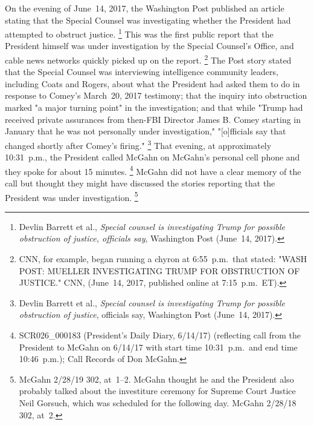 On the evening of June~14, 2017, the Washington Post published an article stating that the Special Counsel was investigating whether the President had attempted to obstruct justice.%
\footnote{Devlin Barrett et al., \textit{Special counsel is investigating Trump for possible obstruction of justice, officials say}, Washington Post (June~14, 2017).}
This was the first public report that the President himself was under investigation by the Special Counsel's Office, and cable news networks quickly picked up on the report.%
\footnote{CNN, for example, began running a chyron at 6:55~p.m.\ that stated: "WASH POST: MUELLER INVESTIGATING TRUMP FOR OBSTRUCTION OF JUSTICE." CNN, (June~14, 2017, published online at 7:15~p.m.~ET).}
The Post story stated that the Special Counsel was interviewing intelligence community leaders, including Coats and Rogers, about what the President had asked them to do in response to Comey's March~20, 2017 testimony;
that the inquiry into obstruction marked "a major turning point" in the investigation;
and that while "Trump had received private assurances from then-FBI Director James B. Comey starting in January that he was not personally under investigation," "[o]fficials say that changed shortly after Comey's firing."%
\footnote{Devlin Barrett et al., \textit{Special counsel is investigating Trump for possible obstruction of justice}, officials say, Washington Post (June~14, 2017).}
That evening, at approximately 10:31~p.m., the President called McGahn on McGahn's personal cell phone and they spoke for about 15 minutes.%
\footnote{SCR026\_000183 (President's Daily Diary, 6/14/17) (reflecting call from the President to McGahn on 6/14/17 with start time 10:31~p.m.\ and end time 10:46~p.m.);
Call Records of Don McGahn.}
McGahn did not have a clear memory of the call but thought they might have discussed the stories reporting that the President was under investigation.%
\footnote{McGahn 2/28/19 302, at~1--2.
McGahn thought he and the President also probably talked about the investiture ceremony for Supreme Court Justice Neil Gorsuch, which was scheduled for the following day.
McGahn 2/28/18 302, at~2.}

